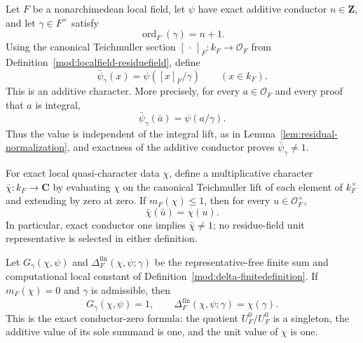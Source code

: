 \begin{theorem}\label{mod:delta-residueformula}
Let $F$ be a nonarchimedean local field, let $\psi$ have exact additive
conductor $n\in\mathbf Z$, and let $\gamma\in F^\times$ satisfy
\[
 \operatorname{ord}_F(\gamma)=n+1.
\]
Using the canonical Teichmuller section $[\,\cdot\,]_F:k_F\to\mathcal O_F$
from Definition~\ref{mod:localfield-residuefield}, define
\[
 \bar\psi_\gamma(x)=\psi([x]_F/\gamma)\qquad(x\in k_F).
\]
This is an additive character.  More precisely, for every $a\in\mathcal
O_F$ and every proof that $a$ is integral,
\[
 \bar\psi_\gamma(\bar a)=\psi(a/\gamma).
\]
Thus the value is independent of the integral lift, as in
Lemma~\ref{lem:residual-normalization}, and exactness of the additive
conductor proves $\bar\psi_\gamma\ne1$.

For exact local quasi-character data $\chi$, define a multiplicative
character $\bar\chi:k_F\to\mathbf C$ by evaluating $\chi$ on the canonical
Teichmuller lift of each element of $k_F^\times$ and extending by zero at
zero.  If $m_F(\chi)\leq1$, then for every $u\in\mathcal O_F^\times$,
\[
 \bar\chi(\bar u)=\chi(u).
\]
In particular, exact conductor one implies $\bar\chi\ne1$; no residue-field
unit representative is selected in either definition.

Let $G_\gamma(\chi,\psi)$ and
$\Delta_F^{\mathrm{fin}}(\chi,\psi;\gamma)$ be the representative-free
finite sum and computational local constant of
Definition~\ref{mod:delta-finitedefinition}.  If $m_F(\chi)=0$ and $\gamma$
is admissible, then
\[
 G_\gamma(\chi,\psi)=1,
 \qquad
 \Delta_F^{\mathrm{fin}}(\chi,\psi;\gamma)=\chi(\gamma).
\]
This is the exact conductor-zero formula: the quotient $U_F^0/U_F^0$ is a
singleton, the additive value of its sole summand is one, and the unit value
of $\chi$ is one.


\end{theorem}
